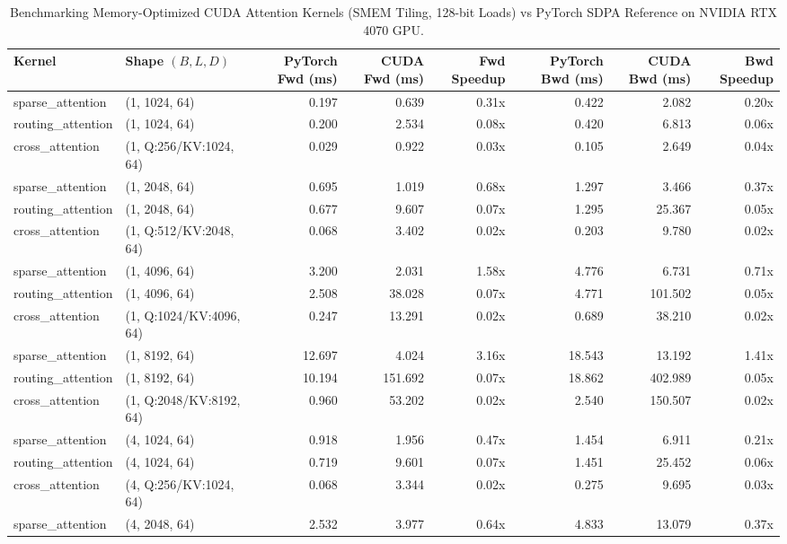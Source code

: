 \documentclass[journal]{IEEEtran}
\begin{document}
\begin{table}[t]
\centering
\small
\caption{Benchmarking Memory-Optimized CUDA Attention Kernels (SMEM Tiling, 128-bit Loads) vs PyTorch SDPA Reference on NVIDIA RTX 4070 GPU.}
\label{tab:cuda_attention_benchmarks}
\begin{tabular}{llrrrrrr}
\toprule
Kernel & Shape $(B, L, D)$ & PyTorch Fwd (ms) & CUDA Fwd (ms) & Fwd Speedup & PyTorch Bwd (ms) & CUDA Bwd (ms) & Bwd Speedup \\
\midrule
sparse\_attention & (1, 1024, 64) & 0.197 & 0.639 & 0.31x & 0.422 & 2.082 & 0.20x \\
routing\_attention & (1, 1024, 64) & 0.200 & 2.534 & 0.08x & 0.420 & 6.813 & 0.06x \\
cross\_attention & (1, Q:256/KV:1024, 64) & 0.029 & 0.922 & 0.03x & 0.105 & 2.649 & 0.04x \\
sparse\_attention & (1, 2048, 64) & 0.695 & 1.019 & 0.68x & 1.297 & 3.466 & 0.37x \\
routing\_attention & (1, 2048, 64) & 0.677 & 9.607 & 0.07x & 1.295 & 25.367 & 0.05x \\
cross\_attention & (1, Q:512/KV:2048, 64) & 0.068 & 3.402 & 0.02x & 0.203 & 9.780 & 0.02x \\
sparse\_attention & (1, 4096, 64) & 3.200 & 2.031 & 1.58x & 4.776 & 6.731 & 0.71x \\
routing\_attention & (1, 4096, 64) & 2.508 & 38.028 & 0.07x & 4.771 & 101.502 & 0.05x \\
cross\_attention & (1, Q:1024/KV:4096, 64) & 0.247 & 13.291 & 0.02x & 0.689 & 38.210 & 0.02x \\
sparse\_attention & (1, 8192, 64) & 12.697 & 4.024 & 3.16x & 18.543 & 13.192 & 1.41x \\
routing\_attention & (1, 8192, 64) & 10.194 & 151.692 & 0.07x & 18.862 & 402.989 & 0.05x \\
cross\_attention & (1, Q:2048/KV:8192, 64) & 0.960 & 53.202 & 0.02x & 2.540 & 150.507 & 0.02x \\
sparse\_attention & (4, 1024, 64) & 0.918 & 1.956 & 0.47x & 1.454 & 6.911 & 0.21x \\
routing\_attention & (4, 1024, 64) & 0.719 & 9.601 & 0.07x & 1.451 & 25.452 & 0.06x \\
cross\_attention & (4, Q:256/KV:1024, 64) & 0.068 & 3.344 & 0.02x & 0.275 & 9.695 & 0.03x \\
sparse\_attention & (4, 2048, 64) & 2.532 & 3.977 & 0.64x & 4.833 & 13.079 & 0.37x \\

\end{tabular}
\end{table}
\end{document}
